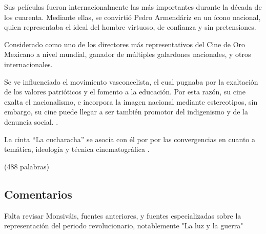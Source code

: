     \begin{compactitem}
    \item Sus películas fueron internacionalmente las más importantes durante la década de los cuarenta. Mediante ellas, se convirtió Pedro Armendáriz en un ícono nacional, quien  representaba el ideal del hombre virtuoso, de confianza y sin pretensiones.\autocite[522]{peter_desarrollo_2008}
    \item Considerado como uno de los directores más representativos del Cine de Oro Mexicano a nivel mundial, ganador de múltiples galardones nacionales, y otros  internacionales. \autocite[9]{aguilar_construccion_2014}
    \item Se ve influenciado el movimiento vasconcelista, el cual pugnaba por la exaltación de los valores patrióticos y el fomento a la educación. Por esta razón, su cine exalta el nacionalismo, e incorpora la imagen nacional mediante estereotipos, sin embargo, su cine puede llegar a ser también promotor del indigenismo y de la denuncia social.  \autocite[9-10]{aguilar_construccion_2014}.
    \item La cinta ``La cucharacha'' se asocia con él por por las convergencias en cuanto a temática, ideología y técnica cinematográfica \autocite[20]{aguilar_construccion_2014}.
    \end{compactitem} 
(488 palabras)
\subsection{Comentarios}
Falta revisar Monsiváis, fuentes anteriores, y fuentes especializadas sobre la representación del periodo revolucionario, notablemente "La luz y la guerra"
\pagebreak
